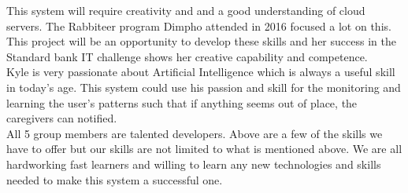 \documentclass{article}
\begin{document}
	This system will require creativity and and a good understanding of cloud servers. The Rabbiteer program Dimpho attended in 2016 focused a lot on this. This project will be an opportunity to develop these skills and her success in the Standard bank IT challenge shows her creative capability and competence.\\
	
	Kyle is very passionate about Artificial Intelligence which is always a useful skill in today's age. This system could use his passion and skill for the monitoring and learning the user's patterns such that if anything seems out of place, the caregivers can notified.\\
	
	All 5 group members are talented developers. Above are a few of the skills we have to offer but our skills are not limited to what is mentioned above. We are all hardworking fast learners and willing to learn any new technologies and skills needed to make this system a successful one. 
	\newpage

\end{document}
